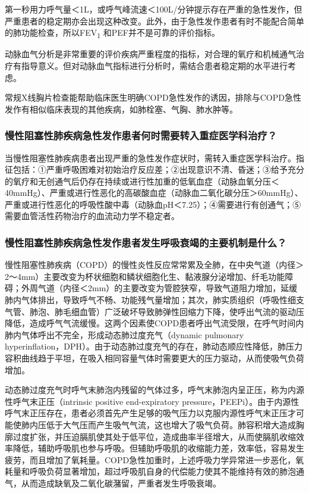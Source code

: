 第一秒用力呼气量＜1L，或呼气峰流速＜100L/分钟提示存在严重的急性发作，但严重患者的稳定期亦会出现这种改变。此外，由于急性发作患者有时不能配合简单的肺功能检查，所以FEV\textsubscript{1}
和PEF并不是可靠的评价指标。

动脉血气分析是非常重要的评价疾病严重程度的指标，对合理的氧疗和机械通气治疗有指导意义。但对动脉血气指标进行分析时，需结合患者稳定期的水平进行考虑。

常规X线胸片检查能帮助临床医生明确COPD急性发作的诱因，排除与COPD急性发作有相似临床表现的其他疾病，如肺栓塞、气胸、肺水肿等。

\subsubsection{慢性阻塞性肺疾病急性发作患者何时需要转入重症医学科治疗？}

当慢性阻塞性肺疾病患者出现严重的急性发作症状时，需转入重症医学科治疗。指征包括：①严重呼吸困难对初始治疗反应差；②出现意识不清、昏迷；③给予充分的氧疗和无创通气后仍存在持续或进行性加重的低氧血症（动脉血氧分压＜40mmHg）、严重或进行性恶化的高碳酸血症（动脉血二氧化碳分压＞60mmHg）、严重或进行性恶化的呼吸性酸中毒（动脉血pH＜7.25）；④需要进行有创通气；⑤需要血管活性药物治疗的血流动力学不稳定者。

\subsubsection{慢性阻塞性肺疾病急性发作患者发生呼吸衰竭的主要机制是什么？}

慢性阻塞性肺疾病（COPD）的慢性炎性反应常常累及全肺，在中央气道（内径＞2～4mm）主要改变为杯状细胞和鳞状细胞化生、黏液腺分泌增加、纤毛功能障碍；外周气道（内径＜2mm）的主要改变为管腔狭窄，导致气道阻力增加，延缓肺内气体排出，导致呼气不畅、功能残气量增加；其次，肺实质组织（呼吸性细支气管、肺泡、肺毛细血管）广泛破坏导致肺弹性回缩力下降，使呼出气流的驱动压降低，造成呼气气流缓慢。这两个因素使COPD患者呼出气流受限，在呼气时间内肺内气体呼出不完全，形成动态肺过度充气（dynamic
pulmonary
hyperinflation，DPH）。由于动态肺过度充气的存在，肺动态顺应性降低，肺压力容积曲线趋于平坦，在吸入相同容量气体时需要更大的压力驱动，从而使吸气负荷增加。

动态肺过度充气时呼气末肺泡内残留的气体过多，呼气末肺泡内呈正压，称为内源性呼气末正压（intrinsic
positive end-expiratory
pressure，PEEPi）。由于内源性呼气末正压存在，患者必须首先产生足够的吸气压力以克服内源性呼气末正压才可能使肺内压低于大气压而产生吸气气流，这也增大了吸气负荷。肺容积增大造成胸廓过度扩张，并压迫膈肌使其处于低平位，造成曲率半径增大，从而使膈肌收缩效率降低，辅助呼吸肌也参与呼吸。但辅助呼吸肌的收缩能力差，效率低，容易发生疲劳，而且增加了氧耗量。COPD急性加重时，上述呼吸力学异常进一步恶化，氧耗量和呼吸负荷显著增加，超过呼吸肌自身的代偿能力使其不能维持有效的肺泡通气，从而造成缺氧及二氧化碳潴留，严重者发生呼吸衰竭。


